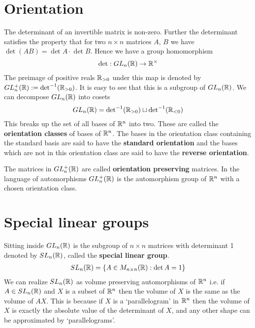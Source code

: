 \section{Orientation}
\label{sec:orientation}
The determinant of an invertible matrix is non-zero. Further the determinant satisfies the property that for two $n\times n$ matrices $A$, $B$ we have $\det (AB) = \det A \cdot \det B$. Hence we have a group homomorphism
\begin{align}
	\det : GL_n(\mathbb{R}) \rightarrow \mathbb{R}^{\times}
\end{align}
The preimage of positive reals $\mathbb{R}_{>0}$ under this map is denoted by $GL_n^+(\mathbb{R}) := \det^{-1}(\mathbb{R}_{>0})$. It is easy to see that this is a subgroup of $GL_n(\mathbb{R})$. We can decompose $GL_n(\mathbb{R})$ into cosets
\begin{align}
	GL_n(\mathbb{R}) = {\det} ^{-1}(\mathbb{R}_{>0}) \sqcup {\det} ^{-1}(\mathbb{R}_{<0})
\end{align}
This breaks up the set of all bases of $\mathbb{R}^n$ into two. These are called the \textbf{orientation classes} of bases of $\mathbb{R}^n$. The bases in the orientation class containing the standard basis are said to have the \textbf{standard orientation} and the bases which are not in this orientation class are said to have the \textbf{reverse orientation}.

The matrices in $GL_n^+(\mathbb{R})$ are called \textbf{orientation preserving} matrices. In the language of automorphisms $GL_n^+(\mathbb{R})$ is the automorphism group of $\mathbb{R}^n$ with a chosen orientation class.







\section{Special linear groups}

Sitting inside $GL_n(\mathbb{R})$ is the subgroup of $n\times n$ matrices with determinant 1 denoted by $SL_n(\mathbb{R})$, called the \textbf{special linear group}.
\begin{align}
	SL_n(\mathbb{R}) = \{ A \in M_{n \times n}(\mathbb{R}) : \det A = 1 \}
\end{align}
We can realize $SL_n(\mathbb{R})$ as volume preserving automorphisms of $\mathbb{R}^n$ i.e. if $A \in SL_n(\mathbb{R})$ and $X$ is a subset of $\mathbb{R}^n$ then the volume of $X$ is the same as the volume of $AX$. This is because if $X$ is a `parallelogram' in $\mathbb{R}^n$ then the volume of $X$ is exactly the absolute value of the determinant of $X$, and any other shape can be approximated by `parallelograms'.

